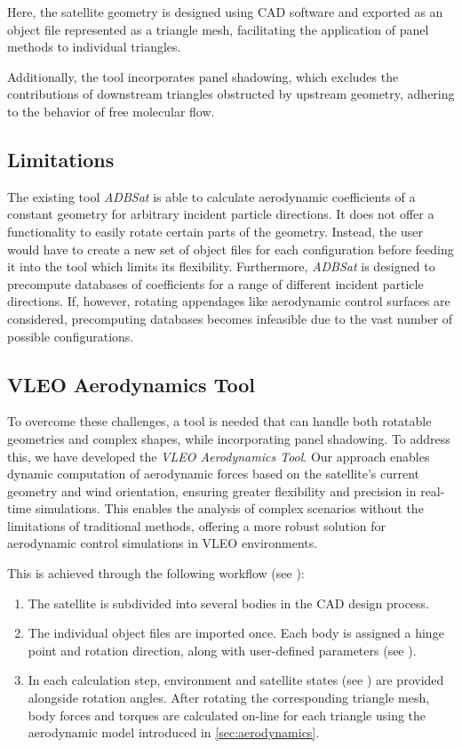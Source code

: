 \documentclass[pdflatex,sn-mathphys-num]{sn-jnl}%
\theoremstyle{thmstyleone}%
\theoremstyle{thmstyletwo}%
\theoremstyle{thmstylethree}%
\begin{document}
	Here, the satellite geometry is designed using CAD software and exported as an object file represented as a triangle mesh, facilitating the application of panel methods to individual triangles.

	Additionally, the tool incorporates panel shadowing, which excludes the contributions of downstream triangles obstructed by upstream geometry, adhering to the behavior of free molecular flow.

	\subsection{Limitations}
	The existing tool \textit{ADBSat} is able to calculate aerodynamic coefficients of a constant geometry for arbitrary incident particle directions.
	It does not offer a functionality to easily rotate certain parts of the geometry.
	Instead, the user would have to create a new set of object files for each configuration before feeding it into the tool which limits its flexibility.
	Furthermore, \textit{ADBSat} is designed to precompute databases of coefficients for a range of different incident particle directions.
	If, however, rotating appendages like aerodynamic control surfaces are considered, precomputing databases becomes infeasible due to the vast number of possible configurations.
	
	\subsection{VLEO Aerodynamics Tool}
	To overcome these challenges, a tool is needed that can handle both rotatable geometries and complex shapes, while incorporating panel shadowing. 
	To address this, we have developed the \textit{VLEO Aerodynamics Tool}. 
	Our approach enables dynamic computation of aerodynamic forces based on the satellite's current geometry and wind orientation, ensuring greater flexibility and precision in real-time simulations. This enables the analysis of complex scenarios without the limitations of traditional methods, offering a more robust solution for aerodynamic control simulations in VLEO environments.

	This is achieved through the following workflow (see ):
	\begin{enumerate}
		\item The satellite is subdivided into several bodies in the CAD design process.
		\item The individual object files are imported once. Each body is assigned a hinge point and rotation direction, along with user-defined parameters (see ).
		\item In each calculation step, environment and satellite states (see ) are provided alongside rotation angles. After rotating the corresponding triangle mesh, body forces and torques are calculated on-line for each triangle using the aerodynamic model introduced in \cref{sec:aerodynamics}.
	\end{enumerate}
\end{document}
